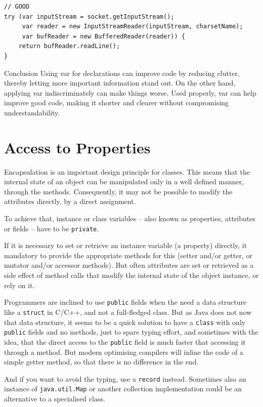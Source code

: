 \documentclass[11pt,a4paper, titlepage, parskip=half, headsepline, footsepline, cleardoublepage=current, headheight=1cm]{scrbook}
\begin{document}
\begin{lstlisting}
// GOOD
try (var inputStream = socket.getInputStream();
     var reader = new InputStreamReader(inputStream, charsetName);
     var bufReader = new BufferedReader(reader)) {
    return bufReader.readLine();
}
\end{lstlisting}

Conclusion
Using var for declarations can improve code by reducing clutter, thereby letting more important information stand out. On the other hand, applying var indiscriminately can make things worse. Used properly, var can help improve good code, making it shorter and clearer without compromising understandability.

\section{Access to Properties}
Encapsulation is an important design principle for classes. This means that the internal state of an object can be manipulated only in a well defined manner, through the methods. Consequently, it may not be possible to modify the attributes  directly, by a direct assignment.

To achieve that, instance or class variables – also known as properties, attributes or fields – have to be \lstinline|private|.

If it is necessary to set or retrieve an instance variable (a property) directly, it mandatory to provide the appropriate methods for this (setter and/or getter, or mutator and/or accessor methods). But often attributes are set or retrieved as a side effect of method calls that modify the internal state of the object instance, or rely on it.

Programmers are inclined to use \lstinline|public| fields when the need a data structure like a \lstinline|struct| in C/C++, and not a full-fledged class. But as Java does not now that data structure, it seems to be a quick solution to have a \lstinline|class| with only \lstinline|public| fields and no methods, just to spare typing effort, and sometimes with the idea, that the direct access to the \lstinline|public| field is much faster that accessing it through a method. But modern optimising compilers will inline the code of a simple getter method, so that there is no difference in the end.

And if you want to avoid the typing, use a \lstinline|record|\autocite{ORACLE_DOC_RECORD,ORACLE_DOC_LANGUAGE_SPECIFICATION:RecordClasses} instead. Sometimes also an instance of \lstinline|java.util.Map| or another collection implementation could be an alternative to a specialised class.
 
\end{document}
